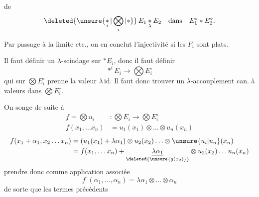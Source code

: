  de
\[
\deleted{\unsure{\mathop{*}_{i}|\bigotimes_i|*}}\, E_1\mathbin{\underset{\lambda}{*}}E_2\quad\text{dans}\quad E_1^\circ * E_2^\circ .
\]

Par passage à la limite etc., on en conclut l'injectivité si les $F_i$ sont plats.

Il faut définir un $\lambda$-scindage  sur $* E_i$, donc il faut définir
\[
\mathop{*}^{i}E_i \longrightarrow \bigotimes E_i^\circ
\]
qui sur $\bigotimes E_i^\circ$ prenne la valeur $\lambda\,\mathrm{id}$. Il faut donc trouver un $\lambda$-accouplement can. à valeurs dans $\bigotimes E_i^\circ$.

On songe  de suite à
\[
\begin{aligned}
f=\bigotimes u_i &: \bigotimes E_i\longrightarrow\bigotimes E_i^\circ\\
f(x_1,\ldots x_n)&=u_1(x_1)\otimes\ldots\otimes u_n(x_n)
\end{aligned}
\]
\[
\begin{aligned}
 f(x_1+\alpha_1,x_2\ldots x_n)&=(u_1(x_1)+\lambda\alpha_1)\otimes u_2(x_2)\ldots\otimes\unsure{u_i|u_n}(x_n)\\
 &=f(x_1,\ldots x_n)+\underset{\deleted{\unsure{g(x_2)}}}{\underline{\lambda\alpha_1}}\otimes u_2(x_2)\ldots u_n(x_n)
\end{aligned}
\]
prendre donc comme application associée
\[
 f^\circ(\alpha_1,\ldots,\alpha_n)=\lambda\alpha_1\otimes\ldots\otimes\alpha_n
\]
de sorte que les termes  précédents 
